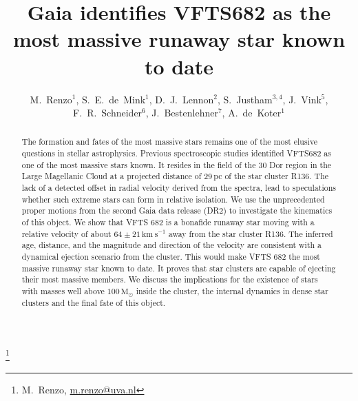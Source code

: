 \documentclass[apjl,twocolumn]{emulateapj}
\newcommand{\kms}{{\,\mathrm{km\ s^{-1}}}}
\newcommand{\Msun}{{\,\mathrm{M}_\odot}}
\begin{document}
\title{Gaia identifies VFTS682 as the most massive %
  runaway star known to date}

\author{M.~Renzo$^{1}$, S.~E.~de~Mink$^{1}$, D.~J.~Lennon$^{2}$,
  S.~Justham$^{3,4}$, J.~Vink$^{5}$, F.~R.~Schneider$^6$,
  J.~Bestenlehner$^7$, A.~de~Koter$^{1}$}

  
\thanks{M.~Renzo, \href{mailto:m.renzo@uva.nl}{m.renzo@uva.nl}}
\date{}
\begin{abstract}
The formation and fates of the most massive stars remains one of the most elusive questions in stellar astrophysics. 
%
Previous spectroscopic studies identified VFTS682 as one of the most massive stars known. It resides in the field of the 30 Dor region in the Large Magellanic Cloud at a projected distance of 29\,pc of the star cluster R136. The lack of a detected offset in radial velocity derived from the spectra, lead to speculations whether such extreme stars can form in relative isolation. 
%
We use the unprecedented proper motions from the second Gaia data
release (DR2) to investigate the kinematics of this object. We show
that VFTS 682 is a bonafide runaway star moving with a relative
velocity of about $64\pm21\kms$ away from the star cluster R136.  The
inferred age, distance, and the magnitude and direction of the
velocity are consistent with a dynamical ejection scenario from the cluster. 
%
This would make VFTS 682 the most massive runaway star known to date.  It proves that star clusters are capable of ejecting their most massive members. We discuss the implications for the existence of stars with masses well above $100\Msun$ inside the cluster, the internal dynamics in dense star clusters and the final fate of this object. 

\end{abstract}
\end{document}
